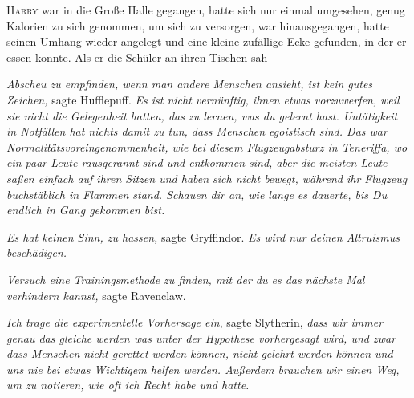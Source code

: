 

\lettrine{H}{arry} war in die Große Halle gegangen, hatte sich nur einmal umgesehen, genug Kalorien zu sich genommen, um sich zu versorgen, war hinausgegangen, hatte seinen Umhang wieder angelegt und eine kleine zufällige Ecke gefunden, in der er essen konnte. Als er die Schüler an ihren Tischen sah—

\emph{Abscheu zu empfinden, wenn man andere Menschen ansieht, ist kein gutes Zeichen,} sagte Hufflepuff. \emph{Es ist nicht vernünftig, ihnen etwas vorzuwerfen, weil sie nicht die Gelegenheit hatten, das zu lernen, was du gelernt hast. Untätigkeit in Notfällen hat nichts damit zu tun, dass Menschen egoistisch sind. Das war Normalitätsvoreingenommenheit, wie bei diesem Flugzeugabsturz in Teneriffa, wo ein paar Leute rausgerannt sind und entkommen sind, aber die meisten Leute saßen einfach auf ihren Sitzen und haben sich nicht bewegt, während ihr Flugzeug buchstäblich in Flammen stand. Schauen dir an, wie lange es dauerte, bis \emph{Du} endlich in Gang gekommen bist.}

\emph{Es hat keinen Sinn, zu hassen,} sagte Gryffindor. \emph{Es wird nur deinen Altruismus beschädigen.}

\emph{Versuch eine Trainingsmethode zu finden, mit der du es das nächste Mal verhindern kannst,} sagte Ravenclaw.

\emph{Ich trage die experimentelle Vorhersage ein}, sagte Slytherin, \emph{dass wir immer genau das gleiche werden was unter der Hypothese vorhergesagt wird, und zwar dass Menschen nicht gerettet werden können, nicht gelehrt werden können und uns nie bei etwas Wichtigem helfen werden. Außerdem brauchen wir einen Weg, um zu notieren, wie oft ich Recht habe und hatte.}

